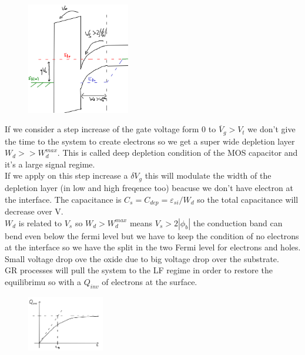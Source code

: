 \begin{figure}
\includegraphics[width=0.4\textwidth]{ddcond.png}
\end{figure}

If we consider a step increase of the gate voltage form 0 to $\overline{V}_g>V_t$ we don't give the time to the system to create electrons so we get a super wide depletion layer $W_d>>W_d^{max}$. This is called deep depletion condition of the MOS capacitor and it's a large signal regime.\\
If we apply on this step increase a $\delta V_g$ this will modulate the width of the depletion layer (in low and high freqence too) beacuse we don't have electron at the interface. The capacitance is $C_s=C_{dep}=\varepsilon_{si}/W_d$ so the total capacitance will decrease over V.\\
$W_d$ is related to $V_s$ so $W_d>W_d^{max}$ means $V_s>2|\phi_b|$ the conduction band can bend even below the fermi level but we have to keep the condition of no electrons at the interface so we have the split in the two Fermi level for electrons and holes. Small voltage drop ove the oxide due to big voltage drop over the substrate.\\
GR processes will pull the system to the LF regime in order to restore the equilibrimu so with a $Q_{inv}$ of electrons at the surface.\\

\begin{figure}
\includegraphics[width=0.3\textwidth]{qinv.png}
\end{figure}

